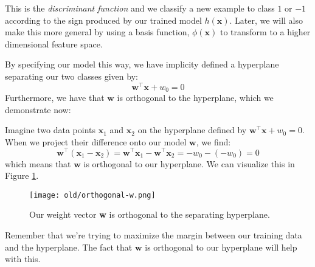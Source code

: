 This is the {\em discriminant function} and we classify a new example to class $1$ or $-1$ according to the sign produced by our trained model $h(\textbf{x})$. Later, we will also make this more general by using a basis function, 
$\phi(\mathbf{x})$ to transform to a higher dimensional feature space.

By specifying our model this way, we have implicity defined a hyperplane separating our two classes given by:
\begin{equation} \label{implicit-hyperplane}
	\textbf{w}^\top \textbf{x} + w_{0} = 0
\end{equation}
Furthermore, we have that $\textbf{w}$ is orthogonal to the hyperplane, which we demonstrate now:

\begin{derivation}
	Imagine two data points $\mathbf{x}_{1}$ and $\mathbf{x}_{2}$ on the hyperplane defined by $\textbf{w}^\top \textbf{x} + w_{0} = 0$. When we project their difference onto our model $\textbf{w}$, we find:
	\begin{equation} \label{hyperplane-eqn}
		\textbf{w}^\top(\textbf{x}_{1} - \textbf{x}_{2}) = \textbf{w}^\top\textbf{x}_{1} - \textbf{w}^\top\textbf{x}_{2} = -w_{0} - (-w_{0}) = 0
	\end{equation}
	which means that $\textbf{w}$ is orthogonal to our hyperplane. We can visualize this in Figure \ref{fig:orthogonal-w}.
\end{derivation}

\begin{figure}
    \centering
    \texttt{[image: old/orthogonal-w.png]}
    \caption{Our weight vector \textbf{w} is orthogonal to the separating hyperplane.}
    \label{fig:orthogonal-w}
\end{figure}

Remember that we're trying to maximize the margin between our training data and the hyperplane. The fact that $\textbf{w}$ is orthogonal to our hyperplane will help with this.

